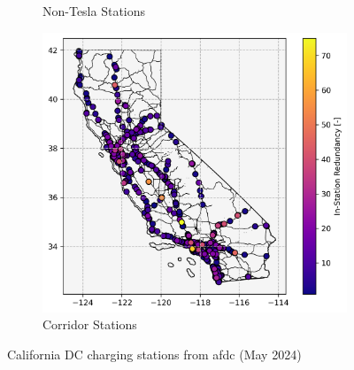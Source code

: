 \begin{figure}[H]
\begin{subfigure}{\linewidth/3}
	\caption{Non-Tesla Stations}
\end{subfigure}
\begin{subfigure}{\linewidth/3}
	\centering
	\includegraphics[width = \linewidth]{figs/California_SNG_C.png}
	\caption{Corridor Stations}
\end{subfigure}
\caption{California DC charging stations from \gls{afdc} (May 2024)}
\label{fig:california_stations}
\end{figure}

